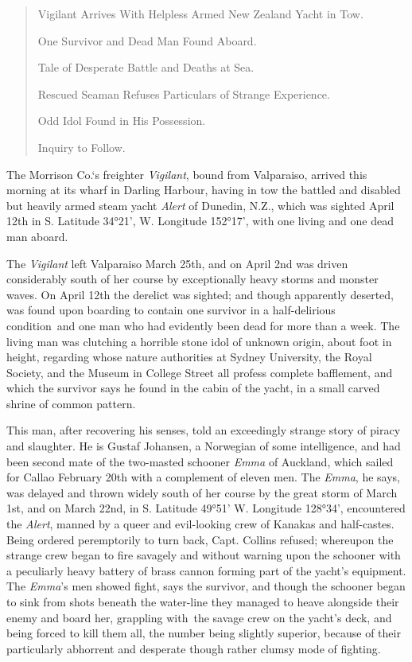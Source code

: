 \begin{quote}

Vigilant Arrives With Helpless Armed New Zealand Yacht in Tow.

One Survivor and Dead Man Found Aboard.

Tale of Desperate Battle and Deaths at Sea.

Rescued Seaman Refuses Particulars of Strange Experience.

Odd Idol Found in His Possession.

Inquiry to Follow.
\end{quote}


The Morrison Co.`s freighter \emph{Vigilant}, bound from Valparaiso, arrived
this morning at its wharf in Darling Harbour, having in tow the battled
and disabled but heavily armed steam yacht \emph{Alert} of Dunedin, N.Z., which
was sighted April 12th in S. Latitude 34°21', W. Longitude 152°17', with
one living and one dead man aboard.

The \emph{Vigilant} left Valparaiso March 25th, and on April 2nd was driven
considerably south of her course by exceptionally heavy storms and
monster waves. On April 12th the derelict was sighted; and though
apparently deserted, was found upon boarding to contain one survivor in
a half-delirious condition\est\ and one man who had evidently been dead for
more than a week. The living man was clutching a horrible stone idol of
unknown origin, about foot in height, regarding whose nature authorities
at Sydney University, the Royal Society, and the Museum in College
Street all profess complete bafflement, and which the survivor says he
found in the cabin of the yacht, in a small carved shrine of common
pattern.

This man, after recovering his senses, told an exceedingly strange story
of piracy and slaughter. He is Gustaf Johansen, a Norwegian of some
intelligence, and had been second mate of the two-masted schooner \emph{Emma}
of Auckland, which sailed for Callao February 20th with a complement of
eleven men. The \emph{Emma}, he says, was delayed and thrown widely south of
her course by the great storm of March 1st, and on March 22nd, in S.
Latitude 49°51' W. Longitude 128°34', encountered the \emph{Alert}, manned by a
queer and evil-looking crew of Kanakas and half-castes. Being ordered
peremptorily to turn back, Capt. Collins refused; whereupon the strange
crew began to fire savagely and without warning upon the schooner with a
peculiarly heavy battery of brass cannon forming part of the yacht's
equipment. The \emph{Emma}'s men showed fight, says the survivor, and though
the schooner began to sink from shots beneath the water-line they
managed to heave alongside their enemy and board her, grappling with\est\ the
 savage crew on the yacht's deck, and being forced to kill them all, the
number being slightly superior, because of their particularly abhorrent
and desperate though rather clumsy mode of fighting.

